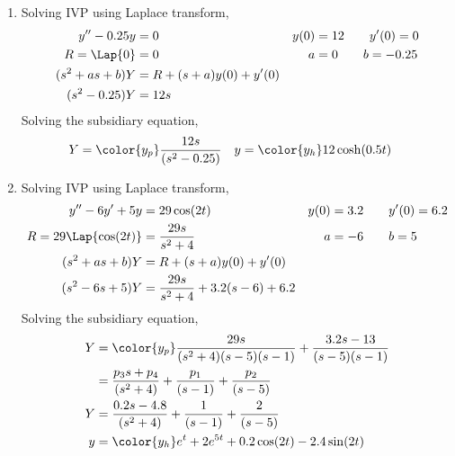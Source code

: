 \begin{enumerate}
    \item Solving IVP using Laplace transform,
          \begin{align}
              y'' - 0.25y     & = 0                     &
              y(0)            & = 12 \qquad y'(0) = 0     \\
              R = \Lap\{0\}   & = 0                     &
              a               & = 0 \qquad b = -0.25      \\
              (s^2 + as + b)Y & = R + (s+a)y(0) + y'(0)   \\
              (s^2 - 0.25)Y   & = 12s
          \end{align}
          Solving the subsidiary equation,
          \begin{align}
              Y & = \color{y_p}\frac{12s}{(s^2-0.25)} &
              y & = \color{y_h} 12\cosh(0.5t)
          \end{align}

    \item Solving IVP using Laplace transform,
          \begin{align}
              y'' - 6y' + 5y         & = 29\cos(2t)                         &
              y(0)                   & = 3.2 \qquad y'(0) = 6.2               \\
              R = 29\Lap\{\cos(2t)\} & = \frac{29s}{s^2 + 4}                &
              a                      & = -6 \qquad b = 5                      \\
              (s^2 + as + b)Y        & = R + (s+a)y(0) + y'(0)                \\
              (s^2 - 6s + 5)Y        & = \frac{29s}{s^2+4} + 3.2(s-6) + 6.2
          \end{align}
          Solving the subsidiary equation,
          \begin{align}
              Y & = \color{y_p}\frac{29s}{(s^2+4)(s-5)(s-1)}
              + \frac{3.2s - 13}{(s-5)(s-1)}                       \\
                & = \frac{p_3s + p_4}{(s^2+4)} + \frac{p_1}{(s-1)}
              + \frac{p_2}{(s-5)}                                  \\
              Y & = \frac{0.2s-4.8}{(s^2+4)}
              + \frac{1}{(s-1)} + \frac{2}{(s-5)}                  \\
              y & = \color{y_h} e^{t} + 2e^{5t} + 0.2\cos(2t)
              - 2.4 \sin(2t)
          \end{align}


\end{enumerate}

